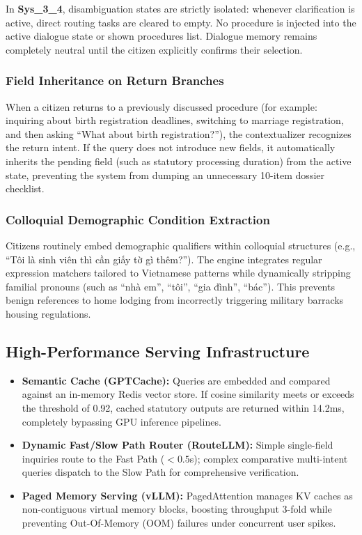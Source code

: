 \documentclass[11pt,a4paper]{article}
\begin{document}
In \textbf{Sys\_3\_4}, disambiguation states are strictly isolated: whenever clarification is active, direct routing tasks are cleared to empty. No procedure is injected into the active dialogue state or shown procedures list. Dialogue memory remains completely neutral until the citizen explicitly confirms their selection.

\subsubsection{Field Inheritance on Return Branches}
When a citizen returns to a previously discussed procedure (for example: inquiring about birth registration deadlines, switching to marriage registration, and then asking ``What about birth registration?''), the contextualizer recognizes the return intent. If the query does not introduce new fields, it automatically inherits the pending field (such as statutory processing duration) from the active state, preventing the system from dumping an unnecessary 10-item dossier checklist.

\subsubsection{Colloquial Demographic Condition Extraction}
Citizens routinely embed demographic qualifiers within colloquial structures (e.g., ``Tôi là sinh viên thì cần giấy tờ gì thêm?''). The engine integrates regular expression matchers tailored to Vietnamese patterns while dynamically stripping familial pronouns (such as ``nhà em'', ``tôi'', ``gia đình'', ``bác''). This prevents benign references to home lodging from incorrectly triggering military barracks housing regulations.

\subsection{High-Performance Serving Infrastructure}
\begin{itemize}
    \item \textbf{Semantic Cache (GPTCache):} Queries are embedded and compared against an in-memory Redis vector store. If cosine similarity meets or exceeds the threshold of 0.92, cached statutory outputs are returned within 14.2ms, completely bypassing GPU inference pipelines.
    \item \textbf{Dynamic Fast/Slow Path Router (RouteLLM):} Simple single-field inquiries route to the Fast Path ($<0.5$s); complex comparative multi-intent queries dispatch to the Slow Path for comprehensive verification.
    \item \textbf{Paged Memory Serving (vLLM):} PagedAttention manages KV caches as non-contiguous virtual memory blocks, boosting throughput 3-fold while preventing Out-Of-Memory (OOM) failures under concurrent user spikes.
\end{itemize}
\end{document}
